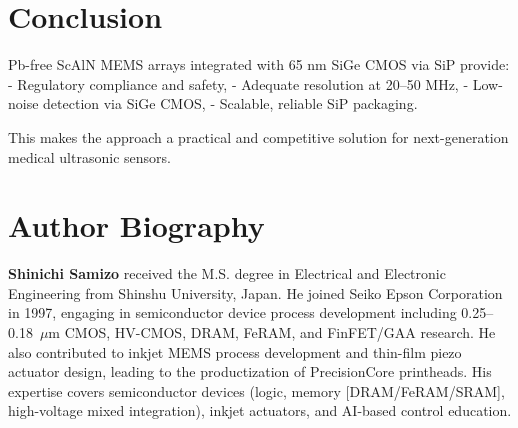 \documentclass[conference]{IEEEtran}
\begin{document}
\section{Conclusion}
Pb-free ScAlN MEMS arrays integrated with 65 nm SiGe CMOS via SiP provide:  
- Regulatory compliance and safety,  
- Adequate resolution at 20--50 MHz,  
- Low-noise detection via SiGe CMOS,  
- Scalable, reliable SiP packaging.  

This makes the approach a practical and competitive solution for next-generation medical ultrasonic sensors.




\nocite{*}

\section*{Author Biography}
\textbf{Shinichi Samizo} received the M.S. degree in Electrical and Electronic Engineering
from Shinshu University, Japan. He joined Seiko Epson Corporation in 1997,
engaging in semiconductor device process development including 0.25--0.18~$\mu$m
CMOS, HV-CMOS, DRAM, FeRAM, and FinFET/GAA research. He also contributed to
inkjet MEMS process development and thin-film piezo actuator design, leading to
the productization of PrecisionCore printheads. His expertise covers
semiconductor devices (logic, memory [DRAM/FeRAM/SRAM], high-voltage mixed
integration), inkjet actuators, and AI-based control education.
\end{document}
